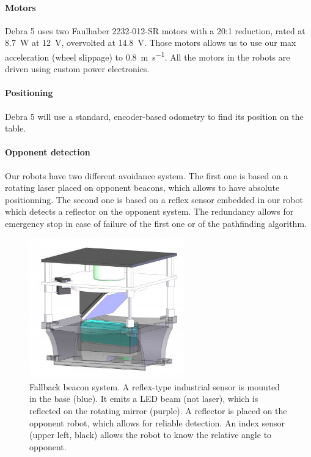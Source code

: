 \documentclass[a4paper]{paper}
\begin{document}
\paragraph{Motors}
Debra 5 uses two Faulhaber 2232-012-SR motors with a 20:1 reduction, rated at \SI{8.7}{\watt} at \SI{12}{\volt}, overvolted at \SI{14.8}{\volt}.
Those motors allows us to use our max acceleration (wheel slippage) to \SI{0.8}{\meter\per\second}.
All the motors in the robots are driven using custom power electronics.

\paragraph{Positioning}
Debra 5 will use a standard, encoder-based odometry to find its position on the table.

\paragraph{Opponent detection}
Our robots have two different avoidance system.
The first one is based on a rotating laser placed on opponent beacons, which allows to have absolute positionning.
The second one is based on a reflex sensor embedded in our robot which detects a reflector on the opponent system.
The redundancy allows for emergency stop in case of failure of the first one or of the pathfinding algorithm.

\begin{figure}[h]
    \begin{center}
        \includegraphics[width=0.6\textwidth]{images/Balise}
        \caption{Fallback beacon system.
            A reflex-type industrial sensor is mounted in the base (blue).
            It emits a LED beam (not laser), which is reflected on the rotating mirror (purple).
            A reflector is placed on the opponent robot, which allows for reliable detection.
            An index sensor (upper left, black) allows the robot to know the relative angle to opponent.
        }
        \label{fig:balise}
    \end{center}
\end{figure}
\end{document}
